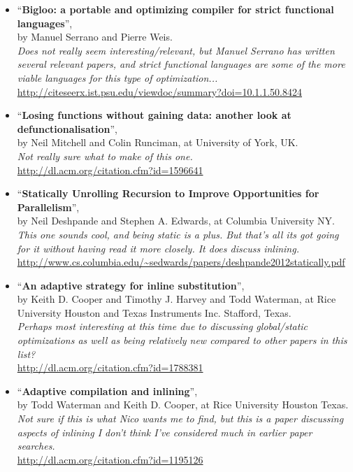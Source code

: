 \begin{itemize}
	\item ``\textbf{Bigloo: a portable and optimizing compiler for strict
functional languages}'', \\ by Manuel Serrano and Pierre Weis. \\
\textit{Does not really seem interesting/relevant, but Manuel Serrano has
written several relevant papers, and strict functional languages are some of
the more viable languages for this type of optimization...} \\
\url{http://citeseerx.ist.psu.edu/viewdoc/summary?doi=10.1.1.50.8424}

	\item ``\textbf{Losing functions without gaining data: another look at
defunctionalisation}'', \\ by Neil Mitchell and Colin Runciman, at University of
York, UK. \\
\textit{Not really sure what to make of this one.} \\
\url{http://dl.acm.org/citation.cfm?id=1596641}

	\item ``\textbf{Statically Unrolling Recursion to Improve Opportunities for
Parallelism}'', \\by Neil Deshpande and Stephen A. Edwards, at Columbia
University NY. \\
\textit{This one sounds cool, and being static is a plus. But that's all its got
going for it without having read it more closely. It does discuss inlining.}\\
\url{http://www.cs.columbia.edu/~sedwards/papers/deshpande2012statically.pdf}

	\item ``\textbf{An adaptive strategy for inline substitution}'', \\ by Keith
D. Cooper and Timothy J. Harvey and Todd Waterman, at Rice University Houston
and Texas Instruments Inc. Stafford, Texas. \\
\textit{Perhaps most interesting at this time due to discussing global/static
optimizations as well as being relatively new compared to other papers in this
list?}\\
\url{http://dl.acm.org/citation.cfm?id=1788381}

	\item ``\textbf{Adaptive compilation and inlining}'', \\ by Todd Waterman
and Keith D. Cooper, at Rice University Houston Texas. \\
\textit{Not sure if this is what Nico wants me to find, but this is a paper
discussing aspects of inlining I don't think I've considered much in earlier
paper searches.}\\
\url{http://dl.acm.org/citation.cfm?id=1195126}


\end{itemize}
